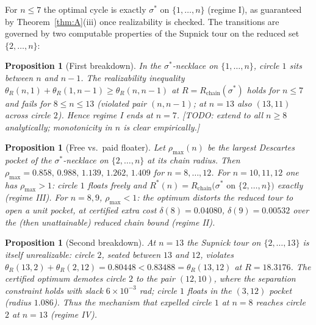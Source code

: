 \documentclass[11pt]{article}
\newtheorem{proposition}[theorem]{Proposition}
\theoremstyle{definition}
\theoremstyle{remark}
\begin{document}
For $n\le7$ the optimal cycle is exactly $\sigma^\ast$ on $\{1,\dots,n\}$ (regime I), as guaranteed by Theorem~\ref{thm:A}(iii) once realizability is checked. The transitions are governed by two computable properties of the Supnick tour on the reduced set $\{2,\dots,n\}$:

\begin{proposition}[First breakdown]\label{prop:break1}
In the $\sigma^\ast$-necklace on $\{1,\dots,n\}$, circle $1$ sits between $n$ and $n-1$. The realizability inequality
$\theta_R(n,1)+\theta_R(1,n-1)\ge\theta_R(n,n-1)$ at $R=R_{\mathrm{chain}}(\sigma^\ast)$
holds for $n\le 7$ and fails for $8\le n\le 13$ (violated pair $(n,n-1)$; at $n=13$ also $(13,11)$ across circle $2$). Hence regime I ends at $n=7$. [TODO: extend to all $n\ge8$ analytically; monotonicity in $n$ is clear empirically.]
\end{proposition}

\begin{proposition}[Free vs.\ paid floater]\label{prop:break2}
Let $\rho_{\max}(n)$ be the largest Descartes pocket of the $\sigma^\ast$-necklace on $\{2,\dots,n\}$ at its chain radius. Then $\rho_{\max}=0.858,\,0.988,\,1.139,\,1.262,\,1.409$ for $n=8,\dots,12$. For $n=10,11,12$ one has $\rho_{\max}>1$: circle $1$ floats freely and
$R^\ast(n)=R_{\mathrm{chain}}\big(\sigma^\ast\text{ on }\{2,\dots,n\}\big)$ exactly (regime III).
For $n=8,9$, $\rho_{\max}<1$: the optimum distorts the reduced tour to open a unit pocket, at certified extra cost $\delta(8)=0.04080$, $\delta(9)=0.00532$ over the (then unattainable) reduced chain bound (regime II).
\end{proposition}

\begin{proposition}[Second breakdown]\label{prop:break3}
At $n=13$ the Supnick tour on $\{2,\dots,13\}$ is itself unrealizable: circle $2$, seated between $13$ and $12$, violates
$\theta_R(13,2)+\theta_R(2,12)=0.80448<0.83488=\theta_R(13,12)$ at $R=18.3176$.
The certified optimum demotes circle $2$ to the pair $(12,10)$, where the separation constraint holds with slack $6\times10^{-3}$ rad; circle $1$ floats in the $(3,12)$ pocket (radius $1.086$). Thus the mechanism that expelled circle $1$ at $n=8$ reaches circle $2$ at $n=13$ (regime IV).
\end{proposition}
\end{document}
